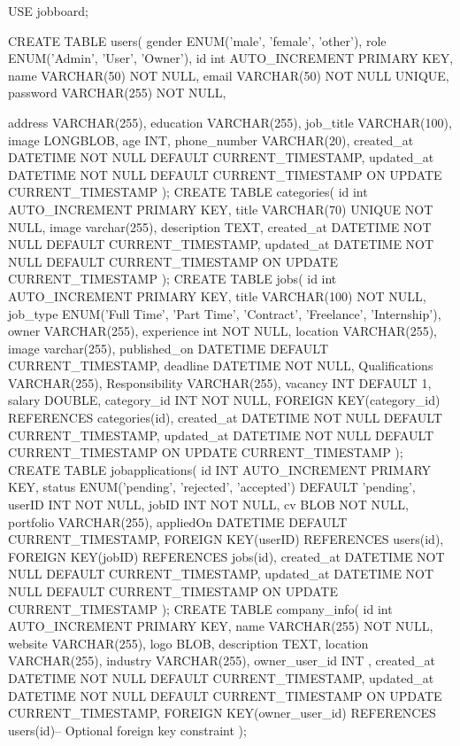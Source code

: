 USE jobboard;

CREATE TABLE users(
    gender ENUM('male', 'female', 'other'),
    role ENUM('Admin', 'User', 'Owner'),
    id int AUTO_INCREMENT PRIMARY KEY,
    name VARCHAR(50) NOT NULL,
    email VARCHAR(50) NOT NULL UNIQUE,
    password VARCHAR(255) NOT NULL,
   
    address VARCHAR(255),
    education VARCHAR(255),
    job_title VARCHAR(100),
    image LONGBLOB,
    age INT,
    phone_number VARCHAR(20),
    created_at DATETIME NOT NULL DEFAULT CURRENT_TIMESTAMP,
    updated_at DATETIME NOT NULL DEFAULT CURRENT_TIMESTAMP ON UPDATE CURRENT_TIMESTAMP
);
CREATE TABLE categories(
    id int AUTO_INCREMENT PRIMARY KEY,
    title VARCHAR(70) UNIQUE NOT NULL,
    image varchar(255),
    description TEXT,
    created_at DATETIME NOT NULL DEFAULT CURRENT_TIMESTAMP,
    updated_at DATETIME NOT NULL DEFAULT CURRENT_TIMESTAMP ON UPDATE CURRENT_TIMESTAMP
);
CREATE TABLE jobs(
    id int AUTO_INCREMENT PRIMARY KEY,
    title VARCHAR(100) NOT NULL,
    job_type ENUM('Full Time', 'Part Time', 'Contract', 'Freelance', 'Internship'),
    owner VARCHAR(255),
    experience int NOT NULL,
    location VARCHAR(255),
    image varchar(255),
    published_on DATETIME DEFAULT CURRENT_TIMESTAMP,
    deadline DATETIME NOT NULL,
    Qualifications VARCHAR(255),
    Responsibility VARCHAR(255),
    vacancy INT DEFAULT 1, salary DOUBLE,
    category_id INT NOT NULL,
    FOREIGN KEY(category_id) REFERENCES categories(id),
    created_at DATETIME NOT NULL DEFAULT CURRENT_TIMESTAMP,
    updated_at DATETIME NOT NULL DEFAULT CURRENT_TIMESTAMP ON UPDATE CURRENT_TIMESTAMP
);
CREATE TABLE jobapplications(
        id INT AUTO_INCREMENT PRIMARY KEY,
        status ENUM('pending', 'rejected', 'accepted') DEFAULT 'pending',
        userID INT NOT NULL,
        jobID INT NOT NULL,
        cv BLOB NOT NULL,
        portfolio VARCHAR(255),
        appliedOn DATETIME DEFAULT CURRENT_TIMESTAMP,
        FOREIGN KEY(userID) REFERENCES users(id),
        FOREIGN KEY(jobID) REFERENCES jobs(id),
        created_at DATETIME NOT NULL DEFAULT CURRENT_TIMESTAMP,
        updated_at DATETIME NOT NULL DEFAULT CURRENT_TIMESTAMP ON UPDATE CURRENT_TIMESTAMP
);
CREATE TABLE company_info(
        id int AUTO_INCREMENT PRIMARY KEY,
        name VARCHAR(255) NOT NULL,
        website VARCHAR(255),
        logo BLOB,
        description TEXT,
        location VARCHAR(255),
        industry VARCHAR(255),
        owner_user_id INT ,
        created_at DATETIME NOT NULL DEFAULT CURRENT_TIMESTAMP,
        updated_at DATETIME NOT NULL DEFAULT CURRENT_TIMESTAMP ON UPDATE CURRENT_TIMESTAMP,
        FOREIGN KEY(owner_user_id) REFERENCES users(id)-- Optional foreign key constraint
);

